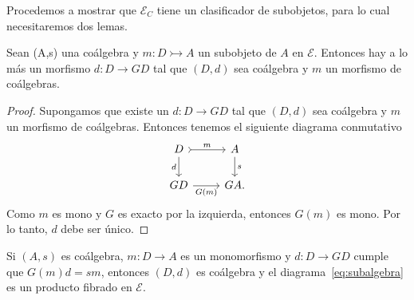 Procedemos a mostrar que $\mathcal{E}_C$ tiene un clasificador de subobjetos, para lo cual necesitaremos dos lemas.
\begin{lemma}
  Sean (A,s) una coálgebra y $m\colon D\rightarrowtail A$ un subobjeto de $A$ en $\mathcal{E}$. Entonces hay
  a lo más un morfismo $d\colon D\to GD$ tal que $(D,d)$ sea coálgebra y $m$ un morfismo de coálgebras.
\end{lemma}
\begin{proof}
  Supongamos que existe un $d\colon D\to GD$ tal que $(D,d)$ sea coálgebra y $m$ un morfismo de coálgebras. Entonces tenemos
  el siguiente diagrama conmutativo
  \begin{equation}
    \label{eq:subalgebra}
    \begin{tikzcd}
      D\ar[tail]{r}{m}\ar[swap]{d}{d} & A\ar{d}{s} \\
      GD\ar[swap]{r}{G(m)} & GA.
    \end{tikzcd}
  \end{equation}
  Como $m$ es mono y $G$ es exacto por la izquierda, entonces $G(m)$ es mono. Por lo tanto, $d$ debe ser único.
\end{proof}
\begin{lemma}
  Si $(A,s)$ es coálgebra, $m\colon D\to A$ es un monomorfismo y $d\colon D\to
  GD$ cumple que $G(m)d=sm$, entonces $(D,d)$ 
  es coálgebra y el diagrama~\eqref{eq:subalgebra} es un producto fibrado en $\mathcal{E}$.
\end{lemma}
